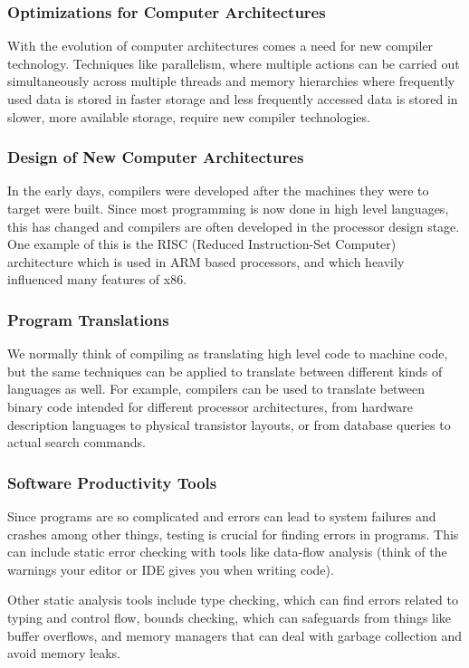 \documentclass[titlepage]{article}
\begin{document}
\subsubsection*{Optimizations for Computer Architectures}
With the evolution of computer architectures comes a need for new compiler technology. Techniques like parallelism, where multiple actions can be carried out simultaneously across multiple threads and memory hierarchies where frequently used data is stored in faster storage and less frequently accessed data is stored in slower, more available storage, require new compiler technologies.

\subsubsection*{Design of New Computer Architectures}
In the early days, compilers were developed after the machines they were to target were built. Since most programming is now done in high level languages, this has changed and compilers are often developed in the processor design stage. One example of this is the RISC (Reduced Instruction-Set Computer) architecture which is used in ARM based processors, and which heavily influenced many features of x86.

\subsubsection*{Program Translations}
We normally think of compiling as translating high level code to machine code, but the same techniques can be applied to translate between different kinds of languages as well. For example, compilers can be used to translate between binary code intended for different processor architectures, from hardware description languages to physical transistor layouts, or from database queries to actual search commands.

\subsubsection*{Software Productivity Tools}
Since programs are so complicated and errors can lead to system failures and crashes among other things, testing is crucial for finding errors in programs. This can include static error checking with tools like data-flow analysis (think of the warnings your editor or IDE gives you when writing code).

Other static analysis tools include type checking, which can find errors related to typing and control flow, bounds checking, which can safeguards from things like buffer overflows, and memory managers that can deal with garbage collection and avoid memory leaks.
\end{document}
